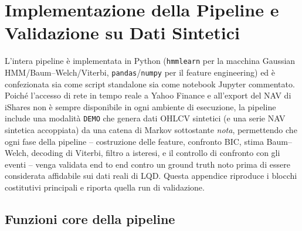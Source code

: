 \documentclass[11pt]{article}
\theoremstyle{definition}
\theoremstyle{remark}
\begin{document}
\section{Implementazione della Pipeline e Validazione su Dati Sintetici}
\label{sec:appendix}

L'intera pipeline \`e implementata in Python (\texttt{hmmlearn} per la macchina Gaussian HMM/Baum--Welch/Viterbi, \texttt{pandas}/\texttt{numpy} per il feature engineering) ed \`e confezionata sia come script standalone sia come notebook Jupyter commentato. Poich\'e l'accesso di rete in tempo reale a Yahoo Finance e all'export del NAV di iShares non \`e sempre disponibile in ogni ambiente di esecuzione, la pipeline include una modalit\`a \texttt{DEMO} che genera dati OHLCV sintetici (e una serie NAV sintetica accoppiata) da una catena di Markov sottostante \emph{nota}, permettendo che ogni fase della pipeline -- costruzione delle feature, confronto BIC, stima Baum--Welch, decoding di Viterbi, filtro a isteresi, e il controllo di confronto con gli eventi -- venga validata end to end contro un ground truth noto prima di essere considerata affidabile sui dati reali di LQD. Questa appendice riproduce i blocchi costitutivi principali e riporta quella run di validazione.

\subsection{Funzioni core della pipeline}
\end{document}
